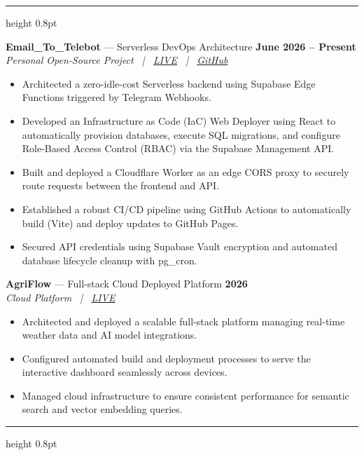 \documentclass[10pt,a4paper]{article}
\newcommand{\resumesection}[1]{%
  \vspace{5pt}%
  \noindent{\large\textbf{#1}}\par
  \vspace{1pt}%
  \hrule height 0.8pt
  \vspace{3pt}%
}
\begin{document}
\resumesection{PROJECTS}

\noindent\textbf{Email\_To\_Telebot} --- Serverless DevOps Architecture \hfill \textbf{June 2026 -- Present} \\
\textit{Personal Open-Source Project \ | \ \href{https://rahul-pamula.github.io/Email_to_telebot/}{LIVE} \ | \ \href{https://github.com/Rahul-pamula/Email_to_telebot}{GitHub}}
\begin{itemize}[leftmargin=1.2em, topsep=0pt, itemsep=0pt, parsep=0pt]
    \item Architected a zero-idle-cost Serverless backend using Supabase Edge Functions triggered by Telegram Webhooks.
    \item Developed an Infrastructure as Code (IaC) Web Deployer using React to automatically provision databases, execute SQL migrations, and configure Role-Based Access Control (RBAC) via the Supabase Management API.
    \item Built and deployed a Cloudflare Worker as an edge CORS proxy to securely route requests between the frontend and API.
    \item Established a robust CI/CD pipeline using GitHub Actions to automatically build (Vite) and deploy updates to GitHub Pages.
    \item Secured API credentials using Supabase Vault encryption and automated database lifecycle cleanup with pg\_cron.
\end{itemize}

\vspace{1pt}

\noindent\textbf{AgriFlow} --- Full-stack Cloud Deployed Platform \hfill \textbf{2026} \\
\textit{Cloud Platform \ | \ \href{https://agriflow-frontend.onrender.com/}{LIVE}}
\begin{itemize}[leftmargin=1.2em, topsep=0pt, itemsep=0pt, parsep=0pt]
    \item Architected and deployed a scalable full-stack platform managing real-time weather data and AI model integrations.
    \item Configured automated build and deployment processes to serve the interactive dashboard seamlessly across devices.
    \item Managed cloud infrastructure to ensure consistent performance for semantic search and vector embedding queries.
\end{itemize}

\resumesection{EDUCATION}
\end{document}
